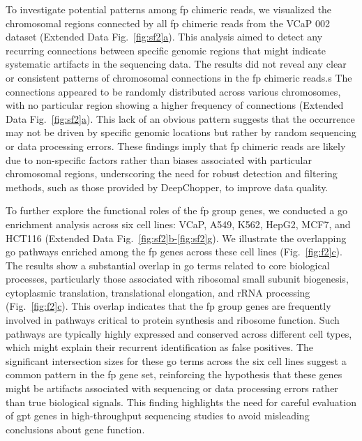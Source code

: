 \documentclass[pdflatex, sn-mathphys-num, lineno]{sn-jnl}%
\newcommand{\figref}[2]{Fig.~\hyperref[#1]{\ref*{#1}#2}}
\newcommand{\edfigref}[2]{Extended Data Fig.~\hyperref[#1]{\ref*{#1}#2}}
\newcommand{\edfigrefrg}[3]{Extended Data Fig.~\hyperref[#1]{\ref*{#1}#2-\ref*{#1}#3}}
\theoremstyle{thmstyleone}%
\theoremstyle{thmstyletwo}%
\theoremstyle{thmstylethree}%
\begin{document}
To investigate potential patterns among \gls{fp} chimeric reads, we visualized the chromosomal regions connected by all \gls{fp} chimeric reads from the VCaP 002 dataset (\edfigref{fig:sf2}{a}).
This analysis aimed to detect any recurring connections between specific genomic regions that might indicate systematic artifacts in the sequencing data.
The results did not reveal any clear or consistent patterns of chromosomal connections in the \gls{fp} chimeric reads.s
The connections appeared to be randomly distributed across various chromosomes, with no particular region showing a higher frequency of connections (\edfigref{fig:sf2}{a}).
This lack of an obvious pattern suggests that the occurrence may not be driven by specific genomic locations but rather by random sequencing or data processing errors.
These findings imply that \gls{fp} chimeric reads are likely due to non-specific factors rather than biases associated with particular chromosomal regions, underscoring the need for robust detection and filtering methods, such as those provided by DeepChopper, to improve data quality.

To further explore the functional roles of the \gls{fp} group genes, we conducted a \gls{go} enrichment analysis across six cell lines: VCaP, A549, K562, HepG2, MCF7, and HCT116 (\edfigrefrg{fig:sf2}{b}{g}).
We illustrate the overlapping \gls{go} pathways enriched among the \gls{fp} genes across these cell lines (\figref{fig:f2}{c}).
The results show a substantial overlap in \gls{go} terms related to core biological processes, particularly those associated with ribosomal small subunit biogenesis, cytoplasmic translation, translational elongation, and rRNA processing (\figref{fig:f2}{c}).
This overlap indicates that the \gls{fp} group genes are frequently involved in pathways critical to protein synthesis and ribosome function.
Such pathways are typically highly expressed and conserved across different cell types, which might explain their recurrent identification as false positives.
The significant intersection sizes for these \gls{go} terms across the six cell lines suggest a common pattern in the \gls{fp} gene set, reinforcing the hypothesis that these genes might be artifacts associated with sequencing or data processing errors rather than true biological signals.
This finding highlights the need for careful evaluation of \gls{gpt} genes in high-throughput sequencing studies to avoid misleading conclusions about gene function.
\end{document}
